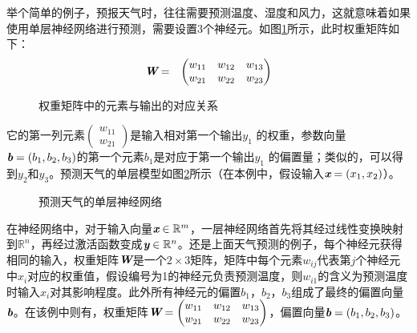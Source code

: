 \parinterval 举个简单的例子，预报天气时，往往需要预测温度、湿度和风力，这就意味着如果使用单层神经网络进行预测，需要设置3个神经元。如图\ref{fig:9-10}所示，此时权重矩阵如下：
\begin{eqnarray}
{\textbf{\em W}}&=&\begin{pmatrix} w_{11} & w_{12} & w_{13}\\ w_{21} & w_{22} & w_{23}\end{pmatrix}
\label{eq:9-105}
\end{eqnarray}

\begin{figure}[htp]
\centering

\caption{权重矩阵中的元素与输出的对应关系}
\label{fig:9-10}
\end{figure}

\noindent 它的第一列元素$ \begin{pmatrix} w_{11}\\ w_{21}\end{pmatrix} $是输入相对第一个输出$ y_1 $ 的权重，参数向量$ {\textbf{\em b}}=(b_1,b_2,b_3) $的第一个元素$ b_1 $是对应于第一个输出$ y_1 $ 的偏置量；类似的，可以得到$ y_2 $和$ y_3 $。预测天气的单层模型如图\ref{fig:9-11}所示（在本例中，假设输入$ {\textbf{\em x}}=(x_1,x_2) $）。

\begin{figure}[htp]
\centering

\caption{预测天气的单层神经网络}
\label{fig:9-11}
\end{figure}

\parinterval 在神经网络中，对于输入向量$ {\textbf{\em x}}\in {\mathbb R}^m $，一层神经网络首先将其经过线性变换映射到$ {\mathbb R}^n $，再经过激活函数变成${\textbf{\em y}}\in {\mathbb R}^n $。还是上面天气预测的例子，每个神经元获得相同的输入，权重矩阵$ {\textbf{\em W}} $是一个$ 2\times 3 $矩阵，矩阵中每个元素$ w_{ij} $代表第$ j $个神经元中$ x_{i} $对应的权重值，假设编号为1的神经元负责预测温度，则$ w_{i1} $的含义为预测温度时输入$ x_{i} $对其影响程度。此外所有神经元的偏置$ b_{1} $，$ b_{2} $，$ b_{3} $组成了最终的偏置向量$ {\textbf{\em b}}$。在该例中则有，权重矩阵$ {\textbf{\em W}}=\begin{pmatrix} w_{11} & w_{12} & w_{13}\\ w_{21} & w_{22} & w_{23}\end{pmatrix} $，偏置向量$ {\textbf{\em b}}=(b_1,b_2,b_3) $。


